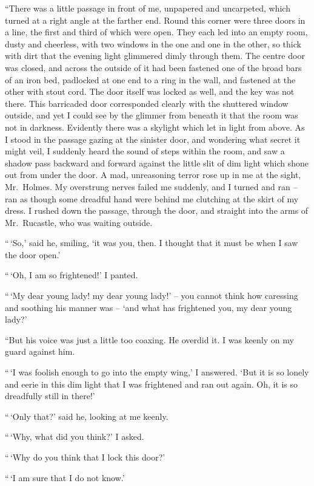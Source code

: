 “There was a little passage in front of me, unpapered and
uncarpeted, which turned at a right angle at the farther end.
Round this corner were three doors in a line, the first and
third of which were open. They each led into an empty room,
dusty and cheerless, with two windows in the one and one in
the other, so thick with dirt that the evening light glimmered
dimly through them. The centre door was closed, and across
the outside of it had been fastened one of the broad bars of
an iron bed, padlocked at one end to a ring in the wall, and
fastened at the other with stout cord. The door itself was
locked as well, and the key was not there. This barricaded
door corresponded clearly with the shuttered window outside,
and yet I could see by the glimmer from beneath it that the
room was not in darkness. Evidently there was a skylight
which let in light from above. As I stood in the passage
gazing at the sinister door, and wondering what secret it
might veil, I suddenly heard the sound of steps within the
room, and saw a shadow pass backward and forward against
the little slit of dim light which shone out from under the
door. A mad, unreasoning terror rose up in me at the sight,
Mr.~Holmes. My overstrung nerves failed me suddenly, and
I turned and ran -- ran as though some dreadful hand were behind
me clutching at the skirt of my dress. I rushed down
the passage, through the door, and straight into the arms of
Mr.~Rucastle, who was waiting outside.

“\,‘So,’ said he, smiling, ‘it was you, then. I thought that it
must be when I saw the door open.’

“\,‘Oh, I am so frightened!’ I panted.

“\,‘My dear young lady! my dear young lady!’ -- you cannot
think how caressing and soothing his manner was -- ‘and what
has frightened you, my dear young lady?’

“But his voice was just a little too coaxing. He overdid it.
I was keenly on my guard against him.

“\,‘I was foolish enough to go into the empty wing,’ I answered.
‘But it is so lonely and eerie in this dim light that I
was frightened and ran out again. Oh, it is so dreadfully
still in there!’

“\,‘Only that?’ said he, looking at me keenly.

“\,‘Why, what did you think?’ I asked.

“\,‘Why do you think that I lock this door?’

“\,‘I am sure that I do not know.’

